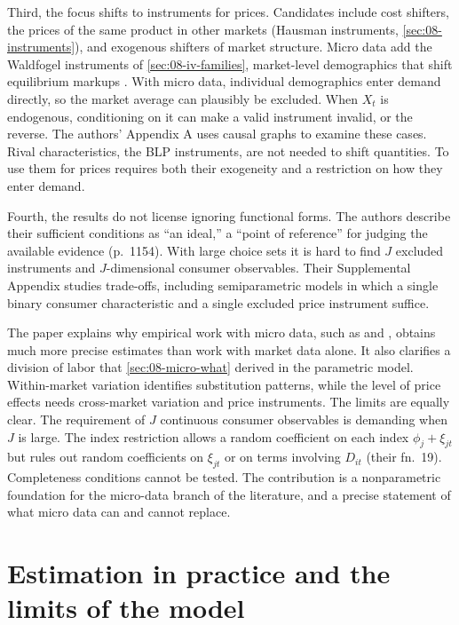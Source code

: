 Third, the focus shifts to instruments for prices. Candidates include cost shifters, the prices of the same product in
other markets (Hausman instruments, \cref{sec:08-instruments}), and exogenous shifters of market structure. Micro data
add the Waldfogel instruments of \cref{sec:08-iv-families}, market-level demographics that shift equilibrium
markups \citep{Waldfogel2003}. With micro
data, individual demographics enter demand directly, so the market average can plausibly be excluded. When $X_t$ is
endogenous, conditioning on it can make a valid instrument invalid, or the reverse. The authors' Appendix A uses causal
graphs to examine these cases. Rival characteristics, the BLP instruments, are not needed to shift quantities. To use
them for prices requires both their exogeneity and a restriction on how they enter demand.

Fourth, the results do not license ignoring functional forms. The authors describe their sufficient conditions as ``an
ideal,'' a ``point of reference'' for judging the available evidence (p.~1154). With large choice sets it is hard to find $J$ excluded instruments and
$J$-dimensional consumer observables. Their Supplemental Appendix studies trade-offs, including semiparametric models in
which a single binary consumer characteristic and a single excluded price instrument suffice.

The paper explains why empirical work with micro data, such as \citet{Petrin2002} and \citet{BerryLevinsohnPakes2004},
obtains much more precise estimates than work with market data alone. It also clarifies a division of labor that
\cref{sec:08-micro-what} derived in the parametric model. Within-market variation identifies substitution patterns,
while the level of price effects needs cross-market variation and price instruments. The limits are equally clear. The
requirement of $J$ continuous consumer observables is demanding when $J$ is large. The index restriction allows a random
coefficient on each index $\phi_j + \xi_{jt}$ but rules out random coefficients on $\xi_{jt}$ or on terms involving
$D_{it}$ (their fn.~19). Completeness conditions cannot be tested. The contribution is a nonparametric foundation for
the micro-data branch of the literature, and a precise statement of what micro data can and cannot replace.

\section{Estimation in practice and the limits of the model}\label{sec:08-practice}

